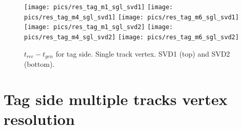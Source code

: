 \documentclass[preprint,aps,showpacs]{revtex4}
\begin{document}
\begin{figure}[htb]
\texttt{[image: pics/res\_tag\_m1\_sgl\_svd1]}
\texttt{[image: pics/res\_tag\_m4\_sgl\_svd1]}
\texttt{[image: pics/res\_tag\_m6\_sgl\_svd1]}\\
\texttt{[image: pics/res\_tag\_m1\_sgl\_svd2]}
\texttt{[image: pics/res\_tag\_m4\_sgl\_svd2]}
\texttt{[image: pics/res\_tag\_m6\_sgl\_svd2]}\\
\caption{$t_{rec}-t_{gen}$ for tag side. Single track vertex. SVD1 (top) and SVD2 (bottom).}
\label{fig:R_det_asc_sgl}
\end{figure}

\section{Tag side multiple tracks vertex resolution}
\end{document}
